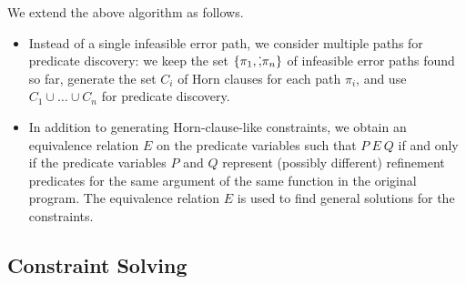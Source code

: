 We extend the above algorithm as follows.
\begin{itemize}
\item Instead of a single infeasible error path, we consider multiple 
paths for predicate discovery:  we keep the set 
\(\{{\pi_1,\dot,\pi_n}\}\) of infeasible error paths found so far, 
generate the set \(C_i\) of Horn clauses for each path \(\pi_i\), and 
use \(C_1 \cup \dots \cup C_n\) for predicate discovery.
\item In addition to generating Horn-clause-like constraints, we obtain 
an equivalence relation \(E\) on the predicate variables such that \(P\ 
E\ Q\) if and only if the predicate variables \(P\) and \(Q\) represent 
(possibly different) refinement predicates for the same argument of the 
same function in the original program.  \todo{an example}  The 
equivalence relation \(E\) is used to find general solutions for the 
constraints.
\end{itemize}





\subsection{Constraint Solving}
\label{sec:cs}


